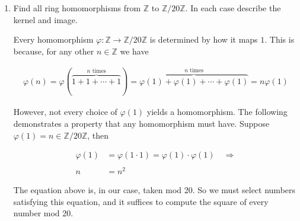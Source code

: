 \documentclass[11pt]{article}
\begin{document}
\begin{enumerate}


\item Find all ring homomorphisms from $\mathbb{Z}$ to $\mathbb{Z}/20\mathbb{Z}$.  In each case describe the kernel and image.

Every homomorphism $\varphi:\mathbb Z\to \mathbb Z/20\mathbb Z$ is determined by how it maps $1$.  This is because, for any other $n\in\mathbb Z$ we have

\begin{align*}
	\varphi(n)=\varphi(\overbrace{1+1+\cdots+1}^{n\text{ times}})=\overbrace{\varphi(1)+\varphi(1)+\cdots+\varphi(1)}^{n \text{ times}} = n\varphi(1)
\end{align*}

However, not every choice of $\varphi(1)$ yields a homomorphism. The following demonstrates a property that any homomorphism must have.  Suppose $\varphi(1)=n\in\mathbb Z/20\mathbb Z$, then

\begin{align*}
	\varphi(1) &= \varphi(1\cdot 1)=\varphi(1)\cdot \varphi(1)\quad \Rightarrow \\\\
	n &= n^2
\end{align*}

The equation above is, in our case, taken mod 20.  So we must select numbers satisfying this equation, and it suffices to compute the square of every number mod 20.


\end{enumerate}
\end{document}
